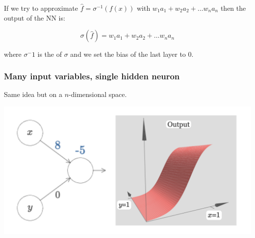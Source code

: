 \documentclass[usenames,dvipsnames]{beamer}
\begin{document}
\begin{frame}
  \vfill
  
If we try to approximate $\hat{f} = \sigma^{-1}(f(x))$ with $w_1a_1 + w_2a_2 + \ldots w_na_n$ then the output of the NN is:

\[ \sigma(\hat{f}) = w_1a_1 + w_2a_2 + \ldots w_na_n \]
  
  where $\sigma^-1$ is the  of $\sigma$ and we set the bias of the last layer to $0$.
  
\end{frame}

\begin{frame}
  \frametitle{Many input variables, single hidden neuron}
  
  Same idea but on a $n$-dimensional space.
  
  \vfill

	\centering
	\includegraphics[scale=.35]{multi-sigmoid}

\end{frame}
\end{document}
